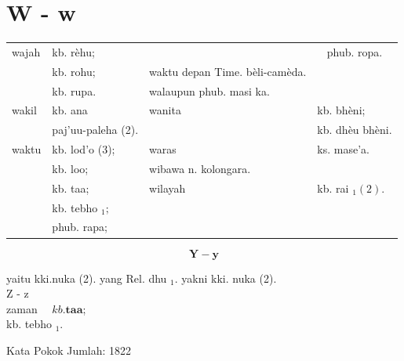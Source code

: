 \documentclass[10pt]{article}
\begin{document}
\section*{W - w}
\begin{center}
\begin{tabular}{llll}
wajah & kb. rèhu; &  & \multicolumn{1}{c}{phub. ropa.} \\
 & kb. rohu; & waktu depan Time. bèli-camèda. &  \\
 & kb. rupa. & walaupun phub. masi ka. &  \\
wakil & kb. ana & wanita & kb. bhèni; \\
 & paj'uu-paleha (2). &  & kb. dhèu bhèni. \\
waktu & kb. lod'o (3); & waras & ks. mase'a. \\
 & kb. loo; & wibawa n. kolongara. &  \\
 & kb. taa; & wilayah & kb. rai \({ }_{1}(2)\). \\
 & kb. tebho \({ }_{1} ;\) &  &  \\
 & phub. rapa; &  &  \\
\end{tabular}
\end{center}

\[
\mathbf{Y}-\mathbf{y}
\]

yaitu kki.nuka (2). yang Rel. dhu \({ }_{1}\). yakni kki. nuka (2).\\
Z - z\\
zaman \(\quad k b . \mathbf{t a a}\);\\
kb. tebho \(_{1}\).

Kata Pokok Jumlah: 1822
\end{document}
